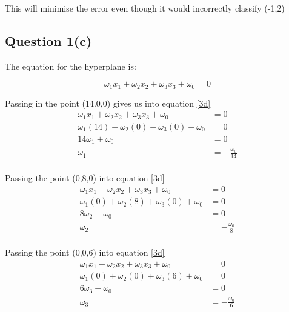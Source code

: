 \documentclass[10pt,a4paper]{article}
\begin{document}
This will minimise the error even though it would incorrectly classify (-1,2)

\subsection{Question 1(c)}

The equation for the hyperplane is: 

\begin{equation}
\label{3d}
\omega_1 x_1 + \omega_2 x_2 + \omega_3 x_3 + \omega_0 = 0
\end{equation}

Passing in the point (14.0,0) gives us into equation \ref{3d}
\begin{equation}
\begin{split}
\omega_1 x_1 + \omega_2 x_2 + \omega_3 x_3 + \omega_0 &= 0 \\
\omega_1(14) + \omega_2(0) + \omega_3(0) + \omega_0 &=0\\
14\omega_1 + \omega_0 &= 0\\
\omega_1 &= -\frac{\omega_0}{14}\\
\end{split}
\end{equation}

Passing the point (0,8,0) into equation \ref{3d}
\begin{equation}
\begin{split}
\omega_1 x_1 + \omega_2 x_2 + \omega_3 x_3 + \omega_0 &= 0 \\
\omega_1(0) + \omega_2(8) + \omega_3(0) + \omega_0 &=0\\
8\omega_2 + \omega_0 &= 0\\
\omega_2 &= -\frac{\omega_0}{8}\\
\end{split}
\end{equation}

Passing the point (0,0,6) into equation \ref{3d}
\begin{equation}
\begin{split}
\omega_1 x_1 + \omega_2 x_2 + \omega_3 x_3 + \omega_0 &= 0 \\
\omega_1(0) + \omega_2(0) + \omega_3(6) + \omega_0 &=0\\
6\omega_3 + \omega_0 &= 0\\
\omega_3 &= -\frac{\omega_0}{6}\\
\end{split}
\end{equation}
\end{document}
